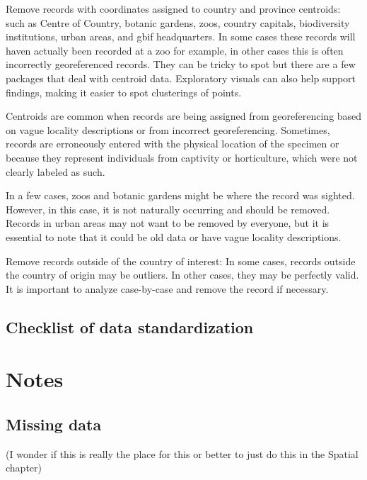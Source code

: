 \documentclass[
  letterpaper,
  DIV=11,
  numbers=noendperiod,
  oneside]{scrreprt}
\begin{document}
Remove records with coordinates assigned to country and province
centroids: such as Centre of Country, botanic gardens, zoos, country
capitals, biodiversity institutions, urban areas, and gbif headquarters.
In some cases these records will haven actually been recorded at a zoo
for example, in other cases this is often incorrectly georeferenced
records. They can be tricky to spot but there are a few packages that
deal with centroid data. Exploratory visuals can also help support
findings, making it easier to spot clusterings of points.

Centroids are common when records are being assigned from georeferencing
based on vague locality descriptions or from incorrect georeferencing.
Sometimes, records are erroneously entered with the physical location of
the specimen or because they represent individuals from captivity or
horticulture, which were not clearly labeled as such.

In a few cases, zoos and botanic gardens might be where the record was
sighted. However, in this case, it is not naturally occurring and should
be removed. Records in urban areas may not want to be removed by
everyone, but it is essential to note that it could be old data or have
vague locality descriptions.

Remove records outside of the country of interest: In some cases,
records outside the country of origin may be outliers. In other cases,
they may be perfectly valid. It is important to analyze case-by-case and
remove the record if necessary.

\hypertarget{checklist-of-data-standardization}{%
\section{Checklist of data
standardization}\label{checklist-of-data-standardization}}


\hypertarget{notes-1}{%
\chapter{Notes}\label{notes-1}}

\hypertarget{missing-data}{%
\section{Missing data}\label{missing-data}}

(I wonder if this is really the place for this or better to just do this
in the Spatial chapter)
\end{document}
